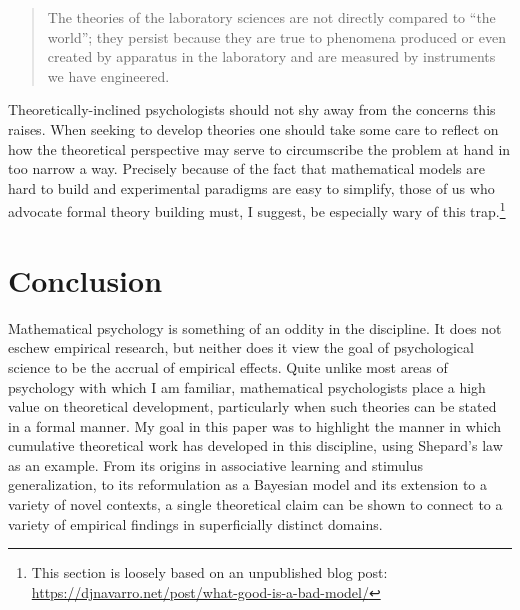 \documentclass[
  english,
  doc]{apa6}
\begin{document}
\begin{quote}
The theories of the laboratory sciences are not directly compared to \enquote{the world}; they persist because they are true to phenomena produced or even created by apparatus in the laboratory and are measured by instruments we have engineered.
\end{quote}

\noindent
Theoretically-inclined psychologists should not shy away from the concerns this raises. When seeking to develop theories one should take some care to reflect on how the theoretical perspective may serve to circumscribe the problem at hand in too narrow a way. Precisely because of the fact that mathematical models are hard to build and experimental paradigms are easy to simplify, those of us who advocate formal theory building must, I suggest, be especially wary of this trap.\footnote{This section is loosely based on an unpublished blog post: \url{https://djnavarro.net/post/what-good-is-a-bad-model/}}

\hypertarget{conclusion}{%
\section{Conclusion}\label{conclusion}}

\noindent
Mathematical psychology is something of an oddity in the discipline. It does not eschew empirical research, but neither does it view the goal of psychological science to be the accrual of empirical effects. Quite unlike most areas of psychology with which I am familiar, mathematical psychologists place a high value on theoretical development, particularly when such theories can be stated in a formal manner. My goal in this paper was to highlight the manner in which cumulative theoretical work has developed in this discipline, using Shepard's law as an example. From its origins in associative learning and stimulus generalization, to its reformulation as a Bayesian model and its extension to a variety of novel contexts, a single theoretical claim can be shown to connect to a variety of empirical findings in superficially distinct domains.
\end{document}
